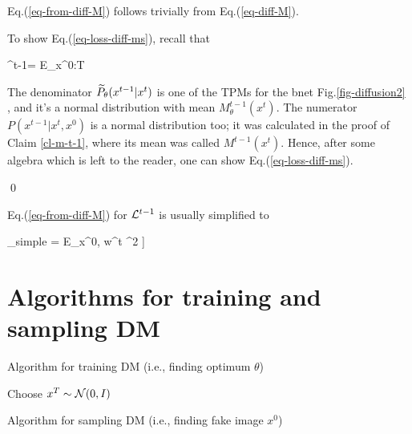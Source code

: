 Eq.(\ref{eq-from-diff-M})
 follows trivially from
Eq.(\ref{eq-diff-M}).

To show Eq.(\ref{eq-loss-diff-ms}),
 recall that

\beq
\call^{t-1}=
E_{x^{0:T}}
\eeq

The denominator
${\widetilde{P}_\theta}(x^{t-1}|x^t)$
is one of the TPMs for
the bnet Fig.\ref{fig-diffusion2} ,
and it's a normal distribution
with mean $M^{t-1}_\theta(x^t)$.
The numerator
$P(x^{t-1}|x^t,x^0)$ is
a normal distribution too;
it was calculated
in the proof
of Claim \ref{cl-m-t-1},
where its mean was called
$M^{t-1}(x^t)$.
Hence, after
some algebra
which is left to the
reader,
one can show Eq.(\ref{eq-loss-diff-ms}). 


\qed

Eq.(\ref{eq-from-diff-M})
for ${\cal L}^{t-1}$
is usually simplified to

\beq
\call_{simple} =
E_{x^0, w^t}
\left[
\left[w^t-n^{t-1}_\theta(
\sqrt{\prodalp}\; x^{0}
 +\sqrt{1-\prodalp}\;w^t
)\right]^2
\right]
\label{eq-diff-loss-simple}
\eeq

\section{Algorithms for training
and sampling DM}

\begin{algorithm}
	\DontPrintSemicolon
    
    \caption{Algorithm for training DM (i.e., finding optimum $\theta$)}
\end{algorithm}

\begin{algorithm}
	\DontPrintSemicolon
    Choose $x^T\sim{\cal N}(0, I)$\;
    \caption{Algorithm for sampling DM (i.e., finding fake image $x^0$)}
\end{algorithm}